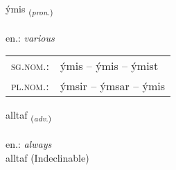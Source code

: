 \documentclass[frontgrid, backgrid]{flacards}\usepackage[]{graphicx}\usepackage[]{xcolor}
\begin{document}
\renewcommand{\blhead}{\vskip5pt {\small\bfseries\footnotesize Fornafn | Pronoun }}
\renewcommand{\bcfoot}{\vskip5pt \hspace{2pt}{\small\bfseries\footnotesize 1K}}


{ýmis \small{\textsubscript{(\textit{pron.})}} \\[1ex] %
\textphonetic{[iːmɪs]} \\
en.: \emph{various} \\  [2ex]
\renewcommand*{\arraystretch}{0.8}
\begin{tabular}{ll}
\textsc{sg.nom.}: & ýmis  --  ýmis -- ýmist \\ 
\textsc{pl.nom.}: & ýmsir -- ýmsar -- ýmis
\end{tabular}
}


\renewcommand{\flhead}{\vskip5pt \fboxsep=0pt {\small\bfseries\footnotesize Atviksorð | Adverb}}
\renewcommand{\fcfoot}{\vskip5pt \fboxsep=0pt \hspace{2pt}{\small\bfseries\footnotesize 1K}}

\renewcommand{\blhead}{\vskip5pt {\small\bfseries\footnotesize Atviksorð | Adverb }}
\renewcommand{\bcfoot}{\vskip5pt \hspace{2pt}{\small\bfseries\footnotesize 1K}}


{alltaf \small{\textsubscript{(\textit{adv.})}} \\[1ex]
\textphonetic{[al̥taf]} \\
en.: \emph{always} \\  [2ex]
alltaf (Indeclinable)}


\renewcommand{\flhead}{\vskip5pt \fboxsep=0pt {\small\bfseries\footnotesize Atviksorð | Adverb}}
\renewcommand{\fcfoot}{\vskip5pt \fboxsep=0pt \hspace{2pt}{\small\bfseries\footnotesize 1K}}

\renewcommand{\blhead}{\vskip5pt {\small\bfseries\footnotesize Atviksorð | Adverb }}
\renewcommand{\bcfoot}{\vskip5pt \hspace{2pt}{\small\bfseries\footnotesize 1K}}
\end{document}
